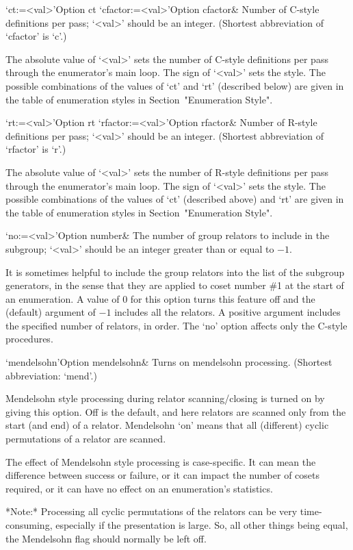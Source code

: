 \>`ct:=<val>'{Option ct}
\>`cfactor:=<val>'{Option cfactor}&
Number of C-style definitions per pass; `<val>' should be an  integer. 
(Shortest abbreviation of `cfactor' is `c'.)

The absolute value of `<val>' sets the
number of C-style definitions per  pass through  the enumerator's main
loop. The sign of `<val>'  sets the  style. The possible  combinations
of the values of `ct' and  `rt'  (described below)  are  given in  the
table of  enumeration styles in Section~"Enumeration Style".

\>`rt:=<val>'{Option rt}
\>`rfactor:=<val>'{Option rfactor}&
Number of R-style definitions per pass; `<val>' should be an  integer. 
(Shortest abbreviation of `rfactor' is `r'.)

The absolute value of `<val>' sets the
number of R-style definitions per  pass through  the enumerator's main
loop. The sign of `<val>'  sets the  style. The possible  combinations
of the values of `ct' (described above)  and  `rt'  are  given in  the
table of  enumeration styles in Section~"Enumeration Style".

\>`no:=<val>'{Option number}&
The number of group relators to include in the subgroup;  
`<val>' should be an integer greater than or equal to $-1$.

It is sometimes helpful to include the group relators into the list of
the subgroup generators,  in the sense that they  are applied to coset
number  \#1 at the  start of  an enumeration.  A value  of 0  for this
option  turns this  feature off  and  the (default)  argument of  $-1$
includes all the relators.  A positive argument includes the specified
number of relators, in order. The `no' option affects only the C-style
procedures.

\>`mendelsohn'{Option mendelsohn}&
Turns on mendelsohn processing. (Shortest abbreviation: `mend'.)

Mendelsohn style processing during relator scanning/closing is  turned
on by giving this option. Off is the default, and  here  relators  are
scanned only from  the  start  (and  end)  of  a  relator.  Mendelsohn
\lq{}on' means that all (different) cyclic permutations of  a  relator
are scanned.

The effect  of Mendelsohn style  processing is case-specific.   It can
mean the difference  between success or failure, or  it can impact the
number  of  cosets   required,  or  it  can  have   no  effect  on  an
enumeration's statistics.

*Note:* Processing all cyclic permutations of the relators can be very
time-consuming,  especially if  the  presentation is  large.  So,  all
other things being equal, the  Mendelsohn flag should normally be left
off.

